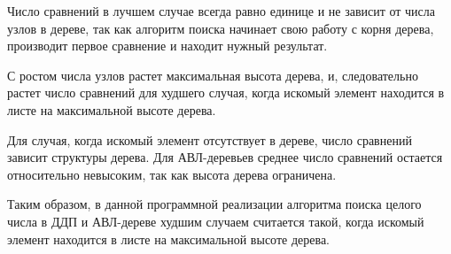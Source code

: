 Число сравнений в лучшем случае всегда равно единице и не зависит от числа узлов в дереве, так как алгоритм поиска начинает свою работу с корня дерева, производит первое сравнение и находит нужный результат.

С ростом числа узлов растет максимальная высота дерева, и, следовательно растет число сравнений для худшего случая, когда искомый элемент находится в листе на максимальной высоте дерева.

\clearpage 

Для случая, когда искомый элемент отсутствует в дереве, число сравнений зависит структуры дерева. Для АВЛ-деревьев среднее число сравнений остается относительно невысоким, так как высота дерева ограничена.

Таким образом, в данной программной реализации алгоритма поиска целого числа в ДДП и АВЛ-дереве
худшим случаем считается такой, когда искомый элемент находится в листе на максимальной высоте дерева.



